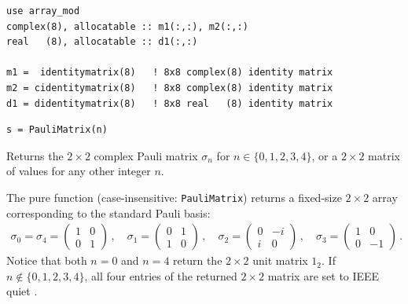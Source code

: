 \begin{description}[leftmargin=2.2cm, style=nextline]
\end{description}

\lstset{language=[95]Fortran}
\begin{lstlisting}
use array_mod
complex(8), allocatable :: m1(:,:), m2(:,:)
real   (8), allocatable :: d1(:,:)

m1 =  identitymatrix(8)   ! 8x8 complex(8) identity matrix
m2 = cidentitymatrix(8)   ! 8x8 complex(8) identity matrix
d1 = didentitymatrix(8)   ! 8x8 real   (8) identity matrix
\end{lstlisting}


\lstset{language=[95]Fortran}
\begin{lstlisting}
s = PauliMatrix(n)
\end{lstlisting}

Returns the $2\times 2$ complex Pauli matrix $\sigma_n$ for $n \in \{0, 1, 2, 3, 4\}$, or a $2\times 2$ matrix of  values for any other integer $n$.

The pure function  (case-insensitive: \texttt{PauliMatrix}) returns a fixed-size $2\times 2$  array corresponding to the standard Pauli basis:
\begin{align}
  \sigma_0 = \sigma_4 = \begin{pmatrix} 1 & 0 \\ 0 & 1 \end{pmatrix}\, , \quad
  \sigma_1 = \begin{pmatrix} 0 & 1 \\ 1 & 0 \end{pmatrix}\, , \quad
  \sigma_2 = \begin{pmatrix} 0 & -i \\ i & 0 \end{pmatrix}\, , \quad
  \sigma_3 = \begin{pmatrix} 1 & 0 \\ 0 & -1 \end{pmatrix}\, .
\end{align}
Notice that both $n=0$ and $n=4$ return the $2\times 2$ unit matrix $1_2$. If $n \notin \{0,1,2,3,4\}$, all four entries of the returned $2\times 2$ matrix are set to IEEE quiet .


